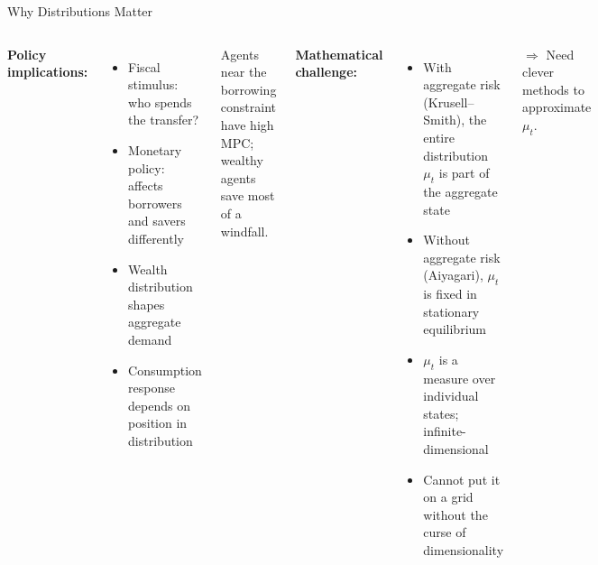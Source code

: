 \documentclass[aspectratio=169,11pt]{beamer}
\newcommand{\emphc}[1]{\textcolor{harvardcrimson}{#1}}
\begin{document}
\begin{frame}{Why Distributions Matter}
\begin{columns}[T]
\textbf{Policy implications:}
\begin{itemize}
    \item Fiscal stimulus: who spends the transfer?
    \item Monetary policy: affects borrowers and savers differently
    \item Wealth distribution shapes \emphc{aggregate demand}
    \item Consumption response depends on \emphc{position in distribution}
\end{itemize}

\vspace{0.3em}
{\small Agents near the borrowing constraint have high MPC; wealthy agents save most of a windfall.}

\textbf{Mathematical challenge:}
\begin{itemize}
    \item With aggregate risk (Krusell--Smith), the \emphc{entire distribution} $\mu_t$ is part of the aggregate state
    \item Without aggregate risk (Aiyagari), $\mu_t$ is fixed in stationary equilibrium
    \item $\mu_t$ is a \emphc{measure} over individual states; infinite-dimensional
    \item Cannot put it on a grid without the curse of dimensionality
\end{itemize}

\vspace{0.3em}
$\Rightarrow$ Need clever methods to approximate $\mu_t$.
\end{columns}
\end{frame}
\end{document}
